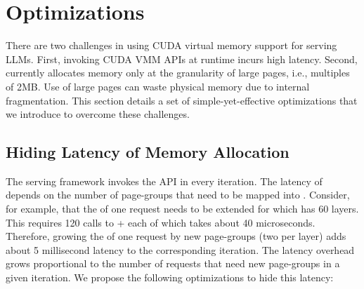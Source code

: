 \section{Optimizations}
\label{sec:design:optimizations}

There are two challenges in using CUDA virtual memory support for serving LLMs. First, invoking CUDA VMM APIs at runtime incurs high latency. Second, \cumemcreate currently allocates memory only at the granularity of large pages, i.e., multiples of 2MB. Use of large pages can waste physical memory due to internal fragmentation.  This section details a set of simple-yet-effective optimizations that we introduce to overcome these challenges.

\subsection{Hiding Latency of Memory Allocation}
The serving framework invokes the \vattnstep API in every iteration. The latency of \vattnstep depends on the number of page-groups that need to be mapped into \kvcache. Consider, for example, that the \kvcache of one request needs to be extended for \yimedium which has 60 layers. This requires 120 calls to \cumemmap + \cumemsetaccess each of which takes about 40 microseconds. Therefore, growing the \kvcache of one request by new page-groups (two per layer) adds about 5 millisecond latency to the corresponding iteration. The latency overhead grows proportional to the number of requests that need new page-groups in a given iteration. We propose the following optimizations to hide this latency:

